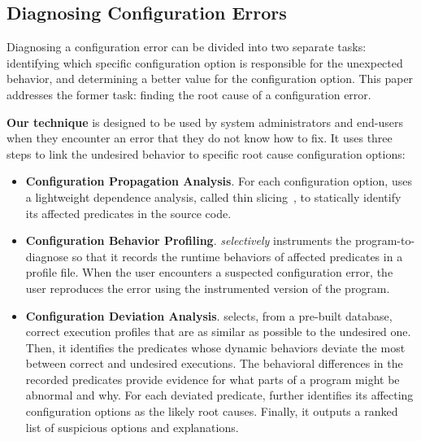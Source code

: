 \subsection{Diagnosing Configuration Errors}

Diagnosing a configuration error can be divided into two
separate tasks: identifying which specific configuration option is
responsible for the unexpected behavior, and determining a better value for
the configuration option. This paper addresses the former task: finding
the root cause of a configuration error.


\textbf{Our technique} is designed to be used by system administrators
and end-users when they encounter an error
that they do not know how to fix. It uses three steps to 
link the undesired behavior to specific root cause configuration options:

\begin{itemize}
\item \textbf{Configuration Propagation Analysis}. For
each configuration option, \ourtool
uses a lightweight dependence analysis, called thin slicing~\cite{Sridharan:2007},
to statically identify its affected predicates in the source code.

\item \textbf{Configuration Behavior Profiling}. \ourtool
\textit{selectively} instruments the program-to-diagnose
so that it records the runtime behaviors of affected predicates
in a profile file.
When the user encounters a suspected configuration error, the user
reproduces the error using the instrumented version of the program.

\item \textbf{Configuration Deviation Analysis}.
\ourtool selects, from a pre-built database, correct execution profiles that are as
similar as possible to the undesired one.
Then, it identifies the predicates whose dynamic behaviors deviate the most
between correct and undesired executions.
The behavioral differences in the recorded predicates provide evidence for what parts of a program might be
abnormal and why. %
For each deviated predicate, \ourtool further identifies
its affecting configuration options as the likely root causes.
Finally, it outputs a ranked list of suspicious options and explanations.

\end{itemize}

